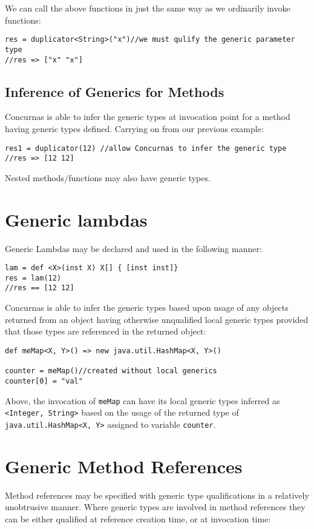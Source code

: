 \documentclass[conc-doc]{subfiles}
\begin{document}
We can call the above functions in just the same way as we ordinarily invoke functions:

\begin{lstlisting}
res = duplicator<String>("x")//we must qulify the generic parameter type
//res => ["x" "x"]
\end{lstlisting}

\subsection{Inference of Generics for Methods}
Concurnas is able to infer the generic types at invocation point for a method having generic types defined. Carrying on from our previous example:

\begin{lstlisting}
res1 = duplicator(12) //allow Concurnas to infer the generic type
//res => [12 12]
\end{lstlisting}

Nested methods/functions may also have generic types.

\section{Generic lambdas}
Generic Lambdas may be declared and used in the following manner:

\begin{lstlisting}
lam = def <X>(inst X) X[] { [inst inst]}
res = lam(12)
//res == [12 12]
\end{lstlisting}

Concurnas is able to infer the generic types based upon usage of any objects returned from an object having otherwise unqualified local generic types provided that those types are referenced in the returned object:
\begin{lstlisting}
def meMap<X, Y>() => new java.util.HashMap<X, Y>()

counter = meMap()//created without local generics
counter[0] = "val"
\end{lstlisting}

Above, the invocation of \lstinline{meMap} can have its local generic types inferred as \lstinline{<Integer, String>} based on the usage of the returned type of \lstinline{java.util.HashMap<X, Y>} assigned to variable \lstinline{counter}.

\section{Generic Method References}
Method references may be specified with generic type qualifications in a relatively unobtrusive manner. Where generic types are involved in method references they can be either qualified at reference creation time, or at invocation time:
\end{document}
